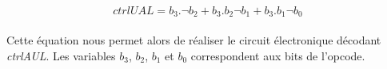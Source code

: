 	\begin{equation}
		ctrlUAL = b_{3} . \neg b_{2} + b_{3} . b_{2} \neg b_{1}  + b_{3} . b_{1} \neg b_{0}
		\label{ual_eq}
	\end{equation}

\paragraph{}{
	Cette équation nous permet alors de réaliser le circuit électronique 
	décodant \textit{ctrlAUL}. Les variables $b_{3}$, $b_{2}$, $b_{1}$ 
	et $b_{0}$ correspondent aux bits de l'opcode.
}